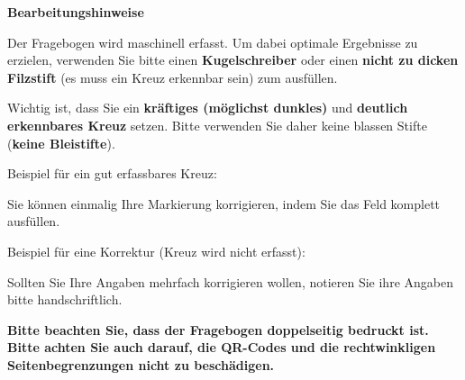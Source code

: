 \vspace{.75cm}

\begin{info}
\vspace{.5em}

\textbf{\Large Bearbeitungshinweise}

Der Fragebogen wird maschinell erfasst. Um dabei optimale Ergebnisse zu erzielen, verwenden Sie bitte einen \textbf{Kugelschreiber} oder einen \textbf{nicht zu dicken Filzstift} (es muss ein Kreuz erkennbar sein) zum ausfüllen.

\vspace{.5em}

Wichtig ist, dass Sie ein \textbf{kräftiges (möglichst dunkles)} und \textbf{deutlich erkennbares Kreuz} setzen. Bitte verwenden Sie daher keine blassen Stifte (\textbf{keine Bleistifte}).

\vspace{.5em}

Beispiel für ein gut erfassbares Kreuz: {\LARGE \checkedbox{}}

\vspace{.5em}

Sie können einmalig Ihre Markierung korrigieren, indem Sie das Feld komplett ausfüllen.

\vspace{.5em}

Beispiel für eine Korrektur (Kreuz wird nicht erfasst): {\LARGE \correctedbox{}}

\vspace{.5em}

Sollten Sie Ihre Angaben mehrfach korrigieren wollen, notieren Sie ihre Angaben bitte handschriftlich.

\vspace{.5em}

\textbf{Bitte beachten Sie, dass der Fragebogen doppelseitig bedruckt ist. Bitte achten Sie auch darauf, die QR-Codes und die rechtwinkligen Seitenbegrenzungen nicht zu beschädigen.}

\end{info}
